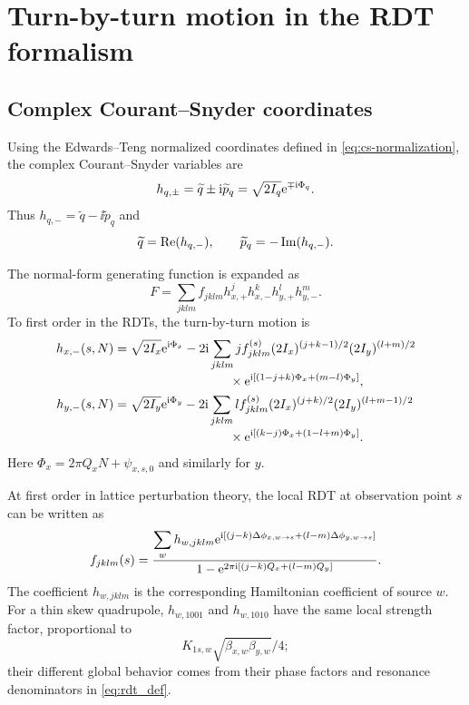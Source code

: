 \section{Turn-by-turn motion in the RDT formalism}
\label{sec:rdt}

\subsection{Complex Courant--Snyder coordinates}

Using the Edwards--Teng normalized coordinates defined in
\cref{eq:cs-normalization}, the complex Courant--Snyder variables are
\begin{equation}
 h_{q,\pm}=\widetilde q\pm\mathrm{i}\widetilde p_q
 =\sqrt{2I_q}\mathrm{e}^{\mp\mathrm{i}\Phi_q}.
 \label{eq:complex-cs}
\end{equation}
Thus $h_{q,-}=\widetilde q-\ii\widetilde p_q$ and
\begin{equation}
 \widetilde q=\operatorname{Re}(h_{q,-}),
 \qquad
 \widetilde p_q=-\operatorname{Im}(h_{q,-}).
\end{equation}

The normal-form generating function is expanded as
\begin{equation}
 F=\sum_{jklm}f_{jklm}
 h_{x,+}^{j}h_{x,-}^{k}h_{y,+}^{l}h_{y,-}^{m}.
\end{equation}
To first order in the RDTs, the turn-by-turn motion is
\begin{align}
 h_{x,-}(s,N)
 &=\sqrt{2I_x}\e^{\ii\Phi_x}
 -2\ii\sum_{jklm}j f_{jklm}^{(s)}
 (2I_x)^{(j+k-1)/2}(2I_y)^{(l+m)/2}
 \nonumber\\[-0.2em]
 &\hspace{3.2cm}\times
 \e^{\ii[(1-j+k)\Phi_x+(m-l)\Phi_y]},
 \label{eq:general-hx-rdt}\\
 h_{y,-}(s,N)
 &=\sqrt{2I_y}\e^{\ii\Phi_y}
 -2\ii\sum_{jklm}l f_{jklm}^{(s)}
 (2I_x)^{(j+k)/2}(2I_y)^{(l+m-1)/2}
 \nonumber\\[-0.2em]
 &\hspace{3.2cm}\times
 \e^{\ii[(k-j)\Phi_x+(1-l+m)\Phi_y]}.
 \label{eq:general-hy-rdt}
\end{align}
Here $\Phi_x=2\pi Q_xN+\psi_{x,s,0}$ and similarly for $y$.

At first order in lattice perturbation theory, the local RDT at observation point $s$ can be written as
\begin{equation}
 f_{jklm}(s)=
 \frac{
  \displaystyle\sum_{w}h_{w,jklm}
  \mathrm{e}^{\mathrm{i}[(j-k)\Delta\phi_{x,w\to s}+(l-m)\Delta\phi_{y,w\to s}]}
 }{
  1-\mathrm{e}^{2\pi\mathrm{i}[(j-k)Q_x+(l-m)Q_y]}
 }.
 \label{eq:general-local-rdt}
\end{equation}
The coefficient $h_{w,jklm}$ is the corresponding Hamiltonian coefficient of source $w$.  For a thin skew quadrupole, $h_{w,1001}$ and $h_{w,1010}$ have the same local strength factor, proportional to
\[
 K_{1s,w}\sqrt{\beta_{x,w}\beta_{y,w}}/4;
\]
their different global behavior comes from their phase factors and resonance denominators in \cref{eq:rdt_def}.


